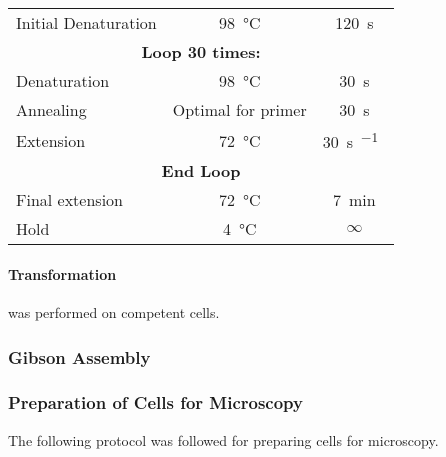 \documentclass[../main.tex]{subfiles}
\begin{document}
\begin{center}
\begin{tabular}{lcc}
Initial Denaturation	& \SI{98}{\degreeCelsius} & \SI{120}{\second}\\
\multicolumn{3}{c}{\textbf{Loop 30 times:}}\\
Denaturation		&	\SI{98}{\degreeCelsius}		&	\SI{30}{\second}\\
Annealing 		&	Optimal for primer	&	\SI{30}{\second}\\
Extension		&	\SI{72}{\degreeCelsius}		&	\SI{30}{\second\per\kilo\base}\\
\multicolumn{3}{c}{\textbf{End Loop}}\\
Final extension	&	\SI{72}{\degreeCelsius}		&	\SI{7}{\minute}\\
Hold				&	\SI{4}{\degreeCelsius}		&	\(\infty\)
\end{tabular}
\end{center}

\paragraph{Transformation} was performed on  competent cells.

\subsubsection{Gibson Assembly}


\subsubsection{Preparation of Cells for Microscopy}

The following protocol was followed for preparing cells for microscopy.
\end{document}
